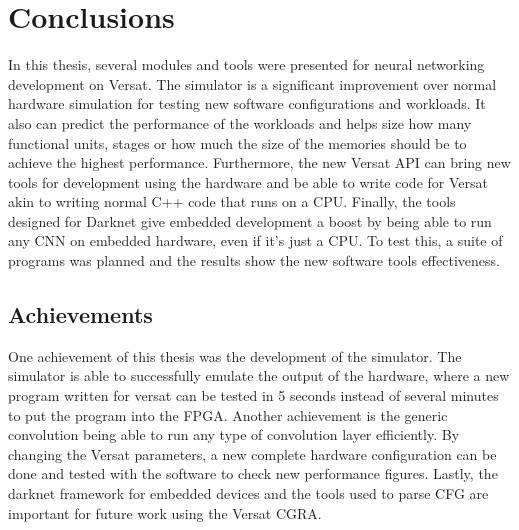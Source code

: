 
\chapter{Conclusions}
\label{chapter:conclusions}

In this thesis, several modules and tools were presented for neural networking development on Versat.
The simulator is a significant improvement over normal hardware simulation for testing new
software configurations and workloads. It also can predict the performance of the workloads
and helps size how many functional units, stages or how much the size of the memories should be
to achieve the highest performance.
Furthermore, the new Versat API can bring new tools for development using the hardware
and be able to write code for Versat akin to writing normal C++ code that runs on a CPU.
Finally, the tools designed for Darknet give embedded development a boost by being able to
run any CNN on embedded hardware, even if it's just a CPU.
To test this, a suite of programs was planned and the results show the new software tools
effectiveness.

\section{Achievements}
\label{section:achievements}

One achievement of this thesis was the development of the simulator. The simulator is able
to successfully emulate the output of the hardware, where a new program written for versat
can be tested in 5 seconds instead of several minutes to put the program into the FPGA.
Another achievement is the generic convolution being able to run any type of convolution layer
efficiently. By changing the Versat parameters, a new complete hardware configuration can be
done and tested with the software to check new performance figures.
Lastly, the darknet framework for embedded devices and the tools used to parse CFG
are important for future work using the Versat CGRA.

